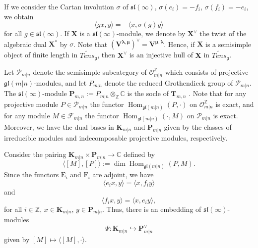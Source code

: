 \documentclass[12pt,oneside,english]{amsart}
\numberwithin{equation}{section}
\numberwithin{figure}{section}
\theoremstyle{plain}
\theoremstyle{plain}
\theoremstyle{remark}
\theoremstyle{definition}
\theoremstyle{plain}
\theoremstyle{remark}
\theoremstyle{definition}
\theoremstyle{plain}
\theoremstyle{plain}
\theoremstyle{definition}
\newcommand{\bT}{\mathbf{T}}
\newcommand{\bP}{\mathbf{P}}
\newcommand{\bV}{\mathbf{V}}
\newcommand{\bK}{\mathbf{K}}
\newcommand{\bX}{\mathbf{X}}
\begin{document}
If we consider the Cartan involution $\sigma$ of $\mathfrak{sl}(\infty)$, $\sigma (e_i)=-f_i$, $\sigma(f_i)=-e_i$, we obtain
\begin{equation}\label{cartan}
\langle g x,y\rangle=-\langle x,\sigma(g)y\rangle
\end{equation}
 for all $g\in\mathfrak{sl}(\infty)$.
If $\bX$ is a $\mathfrak{sl}(\infty)$-module, we denote by $\bX^\vee$ the twist of the algebraic dual $\bX^*$ by $\sigma$.
Note that $ (\bV^{{\boldsymbol{\lambda}},\boldsymbol{\mu}})^\vee= \bV^{\boldsymbol{\mu},{\boldsymbol{\lambda}}}$. Hence, if  $\bX$ is a semisimple object of finite length in $\widetilde{Tens}_{\mathfrak{g}}$, then $\bX^\vee$ is an injective hull of $\bX$ in $\widetilde{Tens}_{\mathfrak{g}}$.





Let $\mathcal P_{m|n}$ denote the semisimple subcategory of $\mathcal{O}_{m|n}^{\mathbb{Z}}$ which consists of projective $\mathfrak {gl}(m|n)$-modules, and let $P_{m|n}$ denote the reduced Grothendieck group of $\mathcal P_{m|n}$.
The $\mathfrak{sl}(\infty)$-module $\bP_{m,n}:= P_{m|n}\otimes_{\mathbb Z}\mathbb C$ is the socle of $\bT_{m,n}$ \cite[Theorem 3.11]{CS}.
Note that for any  projective module $P\in\mathcal P_{m|n}$ the functor $\operatorname{Hom}_{\mathfrak {gl}(m|n)}(P,\cdot)$ on  $\mathcal{O}_{m|n}^{\mathbb{Z}}$ is exact, and  for any module $M\in\mathcal F_{m|n}$  the functor  $\operatorname{Hom}_{\mathfrak {gl}(m|n)}(\cdot,M)$ on $\mathcal P_{m|n}$ is exact.
Moreover, we have the dual bases in $\bK_{m|n}$ and $\bP_{m|n}$ given by the classes of irreducible modules and indecomposable projective modules, respectively.


Consider the pairing $\bK_{m|n}\times \bP_{m|n}\to \mathbb C$ defined by
$$\langle [M],[P]\rangle:=\operatorname{dim}\operatorname{Hom}_{\mathfrak{gl}(m|n)}(P,M).$$
Since the functors $\mathrm{E}_i$ and $\mathrm{F}_i$ are adjoint, we have
$$\langle e_i x,y\rangle=\langle x, f_iy\rangle$$
and
$$\langle f_i x,y\rangle=\langle x, e_iy\rangle,$$
for all $i\in\mathbb{Z}$, $x\in \bK_{m|n}$, $y\in\bP_{m|n}$.
Thus, there is an embedding of $\mathfrak{sl}(\infty)$-modules
\begin{equation}\label{K embeds}\Psi: \bK_{m|n}\hookrightarrow \bP^\vee_{m|n}\end{equation}
 given by  $[M]\mapsto\langle [M],\cdot\rangle$.
\end{document}
